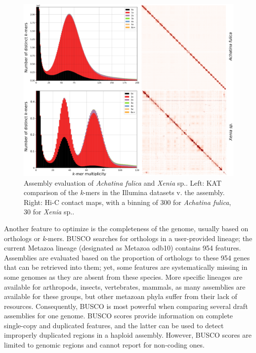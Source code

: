 \begin{figure}
    \centering
    \includegraphics[width=\textwidth]{fig/review_assembly_evaluation.eps}
    \caption{Assembly evaluation of \textit{Achatina fulica} and \textit{Xenia} sp.. Left: KAT comparison of the \textit{k}-mers in the Illumina datasets v. the assembly. Right: Hi-C contact maps, with a binning of 300 for \textit{Achatina fulica}, 30 for \textit{Xenia} sp..}
    \label{fig:evaluation}
\end{figure}

Another feature to optimize is the completeness of the genome, usually based on orthologs or \textit{k}-mers. BUSCO \cite{busco_evaluation} searches for orthologs in a user-provided lineage; the current Metazoa lineage (designated as Metazoa odb10) contains 954 features. Assemblies are evaluated based on the proportion of orthologs to these 954 genes that can be retrieved into them; yet, some features are systematically missing in some genomes as they are absent from these species. More specific lineages are available for arthropods, insects, vertebrates, mammals, as many assemblies are available for these groups, but other metazoan phyla suffer from their lack of resources. Consequently, BUSCO is most powerful when comparing several draft assemblies for one genome. BUSCO scores provide information on complete single-copy and duplicated features, and the latter can be used to detect improperly duplicated regions in a haploid assembly. However, BUSCO scores are limited to genomic regions and cannot report for non-coding ones. \\

